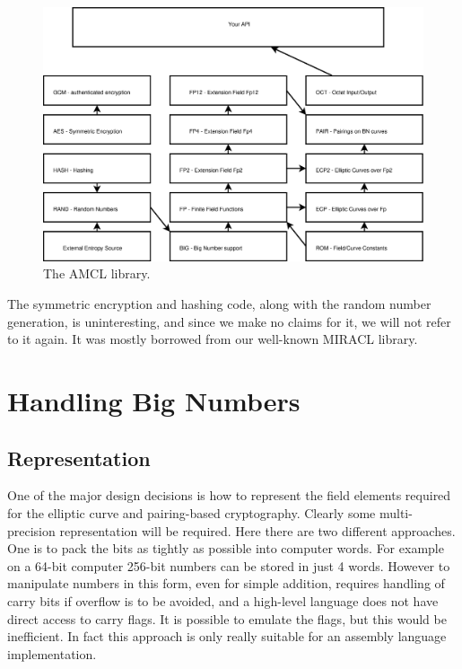\documentclass{llncs}
\begin{document}
\begin{figure}[!htb]
  \begin{center}
    \includegraphics[width=120mm ]{clint.eps}
  \end{center}
  \caption{\small The AMCL library.}
  \label{clint}
\end{figure}

The symmetric encryption and hashing code, along with the random number generation, is uninteresting, and since we make no claims for it, we will not refer to it again. It was mostly
borrowed from our well-known MIRACL library.

\section{Handling Big Numbers}

\subsection{Representation}

One of the major design decisions is how to represent the field elements required for the elliptic curve and pairing-based cryptography. 
Clearly some multi-precision representation will be required.  Here there are two different approaches. 
One is to pack the bits as tightly as possible into computer words. For example on a 64-bit computer 256-bit numbers can be stored in just 4 words. However to manipulate numbers in this 
form, even for simple addition, requires handling of carry bits if overflow is to be avoided, 
and a high-level language does not have direct access to carry flags. It is possible to emulate the flags, but this would be inefficient. In fact this approach is only really suitable 
for an assembly language implementation.
\end{document}
